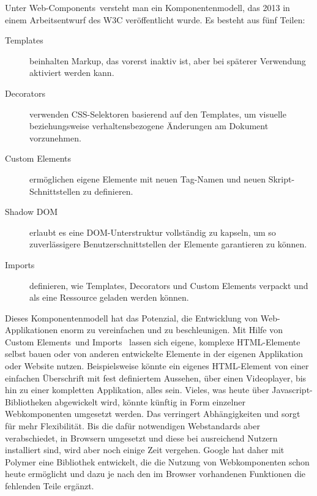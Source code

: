 Unter \glqq Web-Components\grqq\ versteht man ein Komponentenmodell, das 2013 in einem Arbeitsentwurf des W3C veröffentlicht wurde. Es besteht aus fünf Teilen:
\begin{description}
\item[Templates] beinhalten Markup, das vorerst inaktiv ist, aber bei späterer Verwendung aktiviert werden kann.
\item[Decorators] verwenden CSS-Selektoren basierend auf den Templates, um visuelle beziehungsweise verhaltensbezogene Änderungen am Dokument vorzunehmen.
\item[Custom Elements] ermöglichen eigene Elemente mit neuen Tag-Namen und neuen Skript-Schnittstellen zu definieren.
\item[Shadow DOM] erlaubt es eine DOM-Unterstruktur vollständig zu kapseln, um so zuverlässigere Benutzerschnittstellen der Elemente garantieren zu können.
\item[Imports] definieren, wie Templates, Decorators und Custom Elements verpackt und als eine Ressource geladen werden können.
\end{description}
Dieses Komponentenmodell hat das Potenzial, die Entwicklung von Web-Applikationen enorm zu vereinfachen und zu beschleunigen. Mit Hilfe von \glqq Custom Elements\grqq\ und \glqq Imports \grqq\ lassen sich eigene, komplexe HTML-Elemente selbst bauen oder von anderen entwickelte Elemente in der eigenen Applikation oder Website nutzen. Beispielsweise könnte ein eigenes HTML-Element von einer einfachen Überschrift mit fest definiertem Aussehen, über einen Videoplayer, bis hin zu einer kompletten Applikation, alles sein. Vieles, was heute über Javascript-Bibliotheken abgewickelt wird, könnte künftig in Form einzelner Webkomponenten umgesetzt werden. Das verringert Abhängigkeiten und sorgt für mehr Flexibilität. Bis die dafür notwendigen Webstandards aber verabschiedet, in Browsern umgesetzt und diese bei ausreichend Nutzern installiert sind, wird aber noch einige Zeit vergehen. Google hat daher mit Polymer eine Bibliothek entwickelt, die die Nutzung von Webkomponenten schon heute ermöglicht und dazu je nach den im Browser vorhandenen Funktionen die fehlenden Teile ergänzt.

